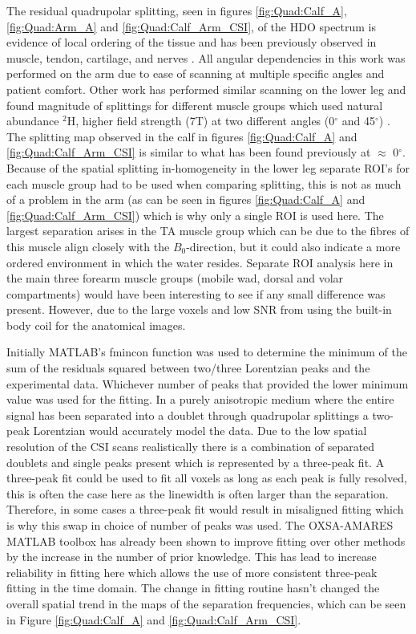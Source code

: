 \documentclass[class=article, crop=false]{standalone}
\begin{document}
The residual quadrupolar splitting, seen in figures \ref{fig:Quad:Calf_A}, \ref{fig:Quad:Arm_A} and \ref{fig:Quad:Calf_Arm_CSI}, of the HDO spectrum is evidence of local ordering of the tissue and has been previously observed in muscle, tendon, cartilage, and nerves \cite{Gursan2022ResidualMuscle,Sharf1995DetectionNMR-Spectroscopy,Perea20072HDisc,Eliav2016MultipleMRS}. All angular dependencies in this work was performed on the arm due to ease of scanning at multiple specific angles and patient comfort. Other work has performed similar scanning on the lower leg and found magnitude of splittings for different muscle groups which used natural abundance $^2$H, higher field strength (7T) at two different angles (0$^\circ$ and 45$^\circ$) \cite{Gursan2022ResidualMuscle}. The splitting map observed in the calf in figures \ref{fig:Quad:Calf_A} and \ref{fig:Quad:Calf_Arm_CSI} is similar to what has been found previously at $\approx$ 0$^\circ$. Because of the spatial splitting in-homogeneity in the lower leg separate ROI's for each muscle group had to be used when comparing splitting, this is not as much of a problem in the arm (as can be seen in figures \ref{fig:Quad:Calf_A} and \ref{fig:Quad:Calf_Arm_CSI}) which is why only a single  ROI is used here. The largest separation arises in the TA muscle group which can be due to the fibres of this muscle align closely \cite{Gursan2022ResidualMuscle} with the $B_0$-direction, but it could also indicate a more ordered environment in which the water resides. Separate ROI analysis here in the main three forearm muscle groups (mobile wad, dorsal and volar compartments) would have been interesting to see if any small difference was present. However, due to the large voxels and low SNR from using the built-in body coil for the anatomical images. 

Initially MATLAB's fmincon function was used to determine the minimum of the sum of the residuals squared between two/three Lorentzian peaks and the experimental data. Whichever number of peaks that provided the lower minimum value was used for the fitting. In a purely anisotropic medium where the entire signal has been separated into a doublet through quadrupolar splittings a two-peak Lorentzian would accurately model the data. Due to the low spatial resolution of the CSI scans realistically there is a combination of separated doublets and single peaks present which is represented by a three-peak fit. A three-peak fit could be used to fit all voxels as long as each peak is fully resolved, this is often the case here as the linewidth is often larger than the separation. Therefore, in some cases a three-peak fit would result in misaligned fitting which is why this swap in choice of number of peaks was used. The OXSA-AMARES MATLAB toolbox has already been shown to improve fitting over other methods by the increase in the number of prior knowledge. This has lead to increase reliability in fitting here which allows the use of more consistent three-peak fitting in the time domain. The change in fitting routine hasn't changed the overall spatial trend in the maps of the separation frequencies, which can be seen in Figure \ref{fig:Quad:Calf_A} and \ref{fig:Quad:Calf_Arm_CSI}.
\end{document}
